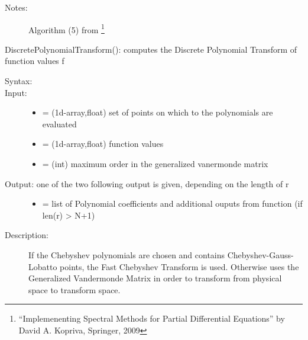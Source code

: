 \documentclass[letterpaper,10pt,english]{sphinxmanual}
\begin{document}
\begin{fulllineitems}
\begin{fulllineitems}
\begin{description}
\item[{Notes:}] \leavevmode
Algorithm (5) from \footnote{
``Implemenenting Spectral Methods for Partial Differential Equations'' by David A. Kopriva, Springer, 2009
}

\end{description}

\end{fulllineitems}


\begin{fulllineitems}
\label{index:SpectralToolbox.Spectral1D.Poly1D.DiscretePolynomialTransform}
DiscretePolynomialTransform(): computes the Discrete Polynomial Transform of function values f
\begin{description}
\item[{Syntax:}] \leavevmode
{}

\item[{Input:}] \leavevmode\begin{itemize}
\item {} 
 = (1d-array,float) set of points on which to the polynomials are evaluated

\item {} 
 = (1d-array,float) function values

\item {} 
 = (int) maximum order in the generalized vanermonde matrix

\end{itemize}

\item[{Output: one of the two following output is given, depending on the length of r}] \leavevmode\begin{itemize}
\item {} 
 = list of Polynomial coefficients and additional ouputs from function  (if len(r) \textgreater{} N+1)

\end{itemize}

\item[{Description:}] \leavevmode
If the Chebyshev polynomials are chosen and  contains Chebyshev-Gauss-Lobatto points, the Fast Chebyshev Transform is used. Otherwise uses the Generalized Vandermonde Matrix in order to transform from physical space to transform space.


\end{description}
\end{fulllineitems}
\end{fulllineitems}
\end{document}
